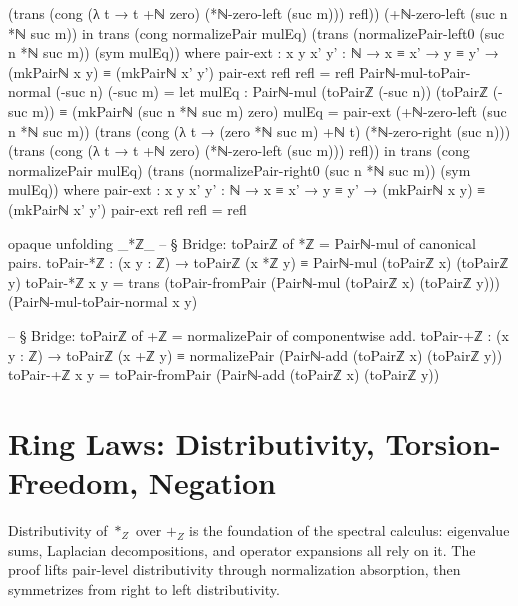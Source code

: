 \documentclass[11pt,a4paper]{book}
\def\mathbb#1{#1}%
\begin{document}
\begin{code}
            (trans
              (cong (λ t → t +ℕ zero) (*ℕ-zero-left (suc m)))
              refl))
          (+ℕ-zero-left (suc n *ℕ suc m))
  in
  trans (cong normalizePair mulEq)
    (trans (normalizePair-left0 (suc n *ℕ suc m)) (sym mulEq))
  where
    pair-ext : {x y x' y' : ℕ} → x ≡ x' → y ≡ y' → (mkPairℕ x y) ≡ (mkPairℕ x' y')
    pair-ext refl refl = refl
Pairℕ-mul-toPair-normal (-suc n) (-suc m) =
  let mulEq : Pairℕ-mul (toPairℤ (-suc n)) (toPairℤ (-suc m)) ≡ (mkPairℕ (suc n *ℕ suc m) zero)
      mulEq =
        pair-ext
          (+ℕ-zero-left (suc n *ℕ suc m))
          (trans
            (cong (λ t → (zero *ℕ suc m) +ℕ t) (*ℕ-zero-right (suc n)))
            (trans
              (cong (λ t → t +ℕ zero) (*ℕ-zero-left (suc m)))
              refl))
  in
  trans (cong normalizePair mulEq)
    (trans (normalizePair-right0 (suc n *ℕ suc m)) (sym mulEq))
  where
    pair-ext : {x y x' y' : ℕ} → x ≡ x' → y ≡ y' → (mkPairℕ x y) ≡ (mkPairℕ x' y')
    pair-ext refl refl = refl

opaque
  unfolding _*ℤ_
  -- § Bridge: toPairℤ of *ℤ = Pairℕ-mul of canonical pairs.
  toPair-*ℤ : (x y : ℤ) → toPairℤ (x *ℤ y) ≡ Pairℕ-mul (toPairℤ x) (toPairℤ y)
  toPair-*ℤ x y =
    trans
      (toPair-fromPair (Pairℕ-mul (toPairℤ x) (toPairℤ y)))
      (Pairℕ-mul-toPair-normal x y)

-- § Bridge: toPairℤ of +ℤ = normalizePair of componentwise add.
toPair-+ℤ : (x y : ℤ) → toPairℤ (x +ℤ y) ≡ normalizePair (Pairℕ-add (toPairℤ x) (toPairℤ y))
toPair-+ℤ x y = toPair-fromPair (Pairℕ-add (toPairℤ x) (toPairℤ y))
\end{code}

\section{Ring Laws: Distributivity, Torsion-Freedom, Negation}

Distributivity of $*_{\mathbb{Z}}$ over $+_{\mathbb{Z}}$ is the foundation of the spectral calculus: eigenvalue sums, Laplacian decompositions, and operator expansions all rely on it.
The proof lifts pair-level distributivity through normalization absorption, then symmetrizes from right to left distributivity.
\end{document}
